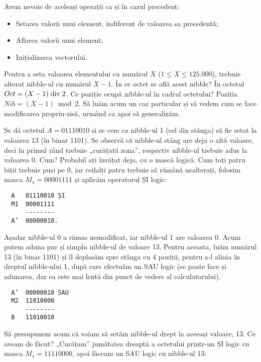 Avem nevoie de aceleași operații ca și în cazul precedent:

\begin{itemize}

\item Setarea valorii unui element, indiferent de valoarea sa precedentă;

\item Aflarea valorii unui element;

\item Inițializarea vectorului.

\end{itemize}

Pentru a seta valoarea elementului cu numărul $X$ ($1 \leq X \leq 125.000$),
trebuie alterat nibble-ul cu numărul $X-1$. În ce octet se află acest nibble?
În octetul $Oct = (X-1) \bdiv 2$. Ce poziție ocupă nibble-ul în cadrul
octetului? Poziția $Nib = (X-1) \bmod 2$. Să luăm acum un caz particular și să
vedem cum se face modificarea propriu-zisă, urmând ca apoi să generalizăm.

Se dă octetul $A = 01110010$ și se cere ca nibble-ul 1 (cel din stânga) să fie
setat la valoarea 13 (în binar 1101). Se observă că nibble-ul stâng are deja o
altă valoare, deci în primul rând trebuie „curățată zona”, respectiv nibble-ul
trebuie adus la valoarea 0. Cum? Probabil ați învățat deja, cu o mască
logică. Cum toți patru biții trebuie puși pe 0, iar ceilalți patru trebuie să
rămână nealterați, folosim masca $M_1 = 00001111$ și aplicăm operatorul ȘI
logic:

\begin{verbatim}
  A   01110010 ȘI
  M1  00001111
      --------
  A’  00000010.
\end{verbatim}

Așadar nibble-ul 0 a rămas nemodificat, iar nibble-ul 1 are valoarea 0. Acum
putem aduna pur și simplu nibble-ul de valoare 13. Pentru aceasta, luăm
numărul 13 (în binar 1101) și îl deplasăm spre stânga cu 4 poziții, pentru a-l
alinia în dreptul nibble-ului 1, după care efectuăm un SAU logic (se poate
face și adunarea, dar ea este mai lentă din punct de vedere al
calculatorului).

\begin{verbatim}
  A’  00000010 SAU
  M2  11010000
      --------
  B   11010010
\end{verbatim}

Să presupunem acum că voiam să setăm nibble-ul drept la aceeași valoare,
13. Ce aveam de făcut? „Curățam” jumătatea dreaptă a octetului printr-un ȘI
logic cu masca $M_1 = 11110000$, apoi făceam un SAU logic cu nibble-ul 13:

